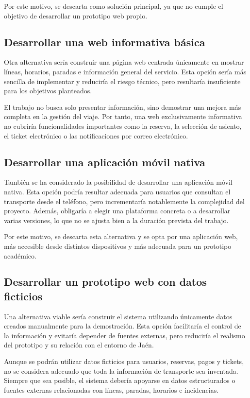 Por este motivo, se descarta como solución principal, ya que no cumple el objetivo de desarrollar un prototipo web propio.

\subsection{Desarrollar una web informativa básica}

Otra alternativa sería construir una página web centrada únicamente en mostrar líneas, horarios, paradas e información general del servicio. Esta opción sería más sencilla de implementar y reduciría el riesgo técnico, pero resultaría insuficiente para los objetivos planteados.

El trabajo no busca solo presentar información, sino demostrar una mejora más completa en la gestión del viaje. Por tanto, una web exclusivamente informativa no cubriría funcionalidades importantes como la reserva, la selección de asiento, el ticket electrónico o las notificaciones por correo electrónico.

\subsection{Desarrollar una aplicación móvil nativa}

También se ha considerado la posibilidad de desarrollar una aplicación móvil nativa. Esta opción podría resultar adecuada para usuarios que consultan el transporte desde el teléfono, pero incrementaría notablemente la complejidad del proyecto. Además, obligaría a elegir una plataforma concreta o a desarrollar varias versiones, lo que no se ajusta bien a la duración prevista del trabajo.

Por este motivo, se descarta esta alternativa y se opta por una aplicación web, más accesible desde distintos dispositivos y más adecuada para un prototipo académico.

\subsection{Desarrollar un prototipo web con datos ficticios}

Una alternativa viable sería construir el sistema utilizando únicamente datos creados manualmente para la demostración. Esta opción facilitaría el control de la información y evitaría depender de fuentes externas, pero reduciría el realismo del prototipo y su relación con el entorno de Jaén.

Aunque se podrán utilizar datos ficticios para usuarios, reservas, pagos y tickets, no se considera adecuado que toda la información de transporte sea inventada. Siempre que sea posible, el sistema debería apoyarse en datos estructurados o fuentes externas relacionadas con líneas, paradas, horarios e incidencias.

